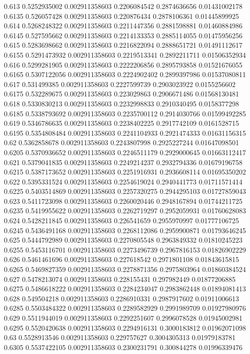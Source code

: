 {0.613 0.5252935002 0.002911358603 0.2206084542 0.2874636656 0.01431002178
0.6135 0.526057428 0.002911358603 0.220876434 0.2878106361 0.01445899925
0.614 0.5268248322 0.002911358603 0.2211447356 0.2881598881 0.01460884986
0.6145 0.527595662 0.002911358603 0.2214133353 0.2885114055 0.01475956256
0.615 0.5283698662 0.002911358603 0.2216822094 0.2888651721 0.01491112617
0.6155 0.5291473932 0.002911358603 0.2219513341 0.2892211711 0.01506352934
0.616 0.5299281905 0.002911358603 0.2222206856 0.2895793858 0.01521676055
0.6165 0.5307122056 0.002911358603 0.2224902402 0.2899397986 0.01537080811
0.617 0.531499385 0.002911358603 0.2227599739 0.2903023922 0.0155256602
0.6175 0.532289675 0.002911358603 0.223029863 0.2906671486 0.01568130481
0.618 0.5330830213 0.002911358603 0.2232998833 0.2910340495 0.0158377298
0.6185 0.5338793692 0.002911358603 0.2235700112 0.2914030766 0.01599492285
0.619 0.5346786635 0.002911358603 0.2238402225 0.2917742109 0.0161528715
0.6195 0.5354808484 0.002911358603 0.2241104933 0.2921474333 0.01631156315
0.62 0.5362858678 0.002911358603 0.2243807998 0.2925227244 0.01647098501
0.6205 0.5370936652 0.002911358603 0.2246511179 0.2929000645 0.01663112417
0.621 0.5379041835 0.002911358603 0.2249214237 0.2932794336 0.01679196758
0.6215 0.5387173652 0.002911358603 0.2251916931 0.2936608114 0.01695350202
0.622 0.5395331524 0.002911358603 0.2254619024 0.2940441773 0.01711571414
0.6225 0.5403514869 0.002911358603 0.2257320275 0.2944295103 0.01727859043
0.623 0.5411723098 0.002911358603 0.2260020446 0.2948167894 0.01744211725
0.6235 0.5419955622 0.002911358603 0.2262719297 0.2952059931 0.01760628083
0.624 0.5428211845 0.002911358603 0.226541659 0.2955970997 0.01777106725
0.6245 0.5436491168 0.002911358603 0.2268112086 0.2959900871 0.01793646245
0.625 0.5444792989 0.002911358603 0.2270805548 0.2963849332 0.01810245223
0.6255 0.5453116701 0.002911358603 0.2273496739 0.2967816153 0.01826902229
0.626 0.5461461696 0.002911358603 0.227618542 0.2971801108 0.01843615815
0.6265 0.5469827359 0.002911358603 0.2278871356 0.2975803964 0.01860384524
0.627 0.5478213074 0.002911358603 0.228155431 0.297982449 0.01877206885
0.6275 0.5486618222 0.002911358603 0.2284234047 0.2983862448 0.01894081413
0.628 0.549504218 0.002911358603 0.2286910331 0.2987917602 0.01911006613
0.6285 0.5503484322 0.002911358603 0.2289582929 0.2991989709 0.01927980976
0.629 0.5511944019 0.002911358603 0.2292251607 0.2996078528 0.01945002981
0.6295 0.5520420638 0.002911358603 0.2294916131 0.3000183812 0.01962071098
0.63 0.5528913546 0.002911358603 0.229757627 0.3004305313 0.01979183781
0.6305 0.5537422105 0.002911358603 0.2300231791 0.300844278 0.01996339476
}

